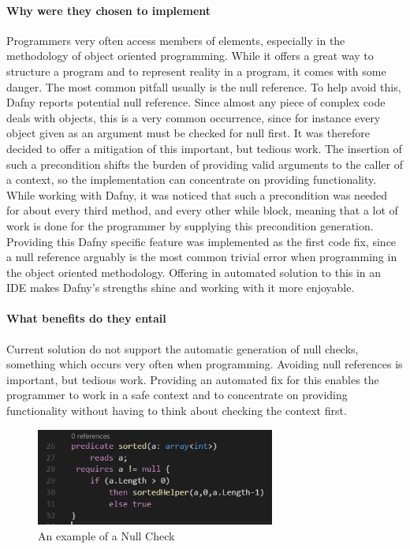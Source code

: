 \paragraph{Why were they chosen to implement}
Programmers very often access members of elements, especially in the methodology of object oriented programming. While it offers a great way to structure a program and to represent reality in a program, it comes with some danger. The most common pitfall usually is the null reference. To help avoid this, Dafny reports potential null reference. Since almost any piece of complex code deals with objects, this is a very common occurrence, since for instance every object given as an argument must be checked for null first. \newline
It was therefore decided to offer a mitigation of this important, but tedious work. The insertion of such a precondition shifts the burden of providing valid arguments to the caller of a context, so the implementation can concentrate on providing functionality. While working with Dafny, it was noticed that such a precondition was needed for about every third method, and every other while block, meaning that a lot of work is done for the programmer by supplying this precondition generation.
\newline
Providing this Dafny specific feature was implemented as the first code fix, since a null reference arguably is the most common trivial error when programming in the object oriented methodology. Offering in automated solution to this in an IDE makes Dafny's strengths shine and working with it more enjoyable.

\paragraph{What benefits do they entail}
Current solution do not support the automatic generation of null checks, something which occurs very often when programming. Avoiding null references is important, but tedious work. Providing an automated fix for this enables the programmer to work in a safe context and to concentrate on providing functionality without having to think about checking the context first. \newline

\begin{figure}[H]
	\centering
	\includegraphics[width=0.7\textwidth]{img/nullCheckApplied}
	\caption{An example of a Null Check}
	\label{fig:dfnullcheckapplied}
\end{figure}

